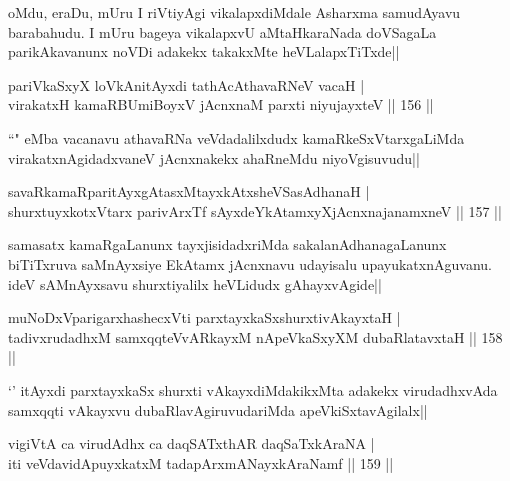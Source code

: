 \begin{artha}
oMdu, eraDu, mUru I riVtiyAgi vikalapxdiMdale Asharxma samudAyavu barabahudu. I mUru bageya vikalapxvU aMtaHkaraNada doVSagaLa parikAkavanunx noVDi adakekx takakxMte heVLalapxTiTxde||
\end{artha}

\begin{shl}
pariVkaSxyX loVkAnitAyxdi tathAcA\s \s thavaRNeV vacaH |\\
virakatxH kamaRBUmiBoyxV jAcnxnaM parxti niyujayxteV \hfill || 156 ||
\end{shl}

\begin{artha}
``\stext " eMba vacanavu athavaRNa veVdadalilxdudx kamaRkeSxVtarxgaLiMda virakatxnAgidadxvaneV jAcnxnakekx ahaRneMdu niyoVgisuvudu||
\end{artha}


\begin{shl}
savaRkamaRparitAyxgAtasxMtayxkAtxsheVSasAdhanaH |\\
shurxtuyxkotxV\s tarx parivArxTf sAyxdeYkAtamxyXjAcnxnajanamxneV \hfill || 157 ||
\end{shl}

\begin{artha}
samasatx kamaRgaLanunx tayxjisidadxriMda sakalanAdhanagaLanunx biTiTxruva saMnAyxsiye EkAtamx jAcnxnavu udayisalu upayukatxnAguvanu. ideV sAMnAyxsavu shurxtiyalilx heVLidudx gAhayxvAgide||
\end{artha}


\begin{shl}
muNoDxV\s parigarxhashecxVti parxtayxkaSxshurxtivAkayxtaH |\\
tadivxrudadhxM samxqqteVvARkayxM nApeVkaSxyXM dubaRlatavxtaH \hfill || 158 ||
\end{shl}

\begin{artha}
`\stext ' itAyxdi parxtayxkaSx shurxti vAkayxdiMdakikxMta adakekx virudadhxvAda samxqqti vAkayxvu dubaRlavAgiruvudariMda apeVkiSxtavAgilalx||
\end{artha}

\begin{shl}
vigiVtA ca virudAdhx ca daqSATxthAR daqSaTxkAraNA |\\
iti veVdavidA\s puyxkatxM tadapArxmANayxkAraNamf \hfill || 159 ||
\end{shl}


